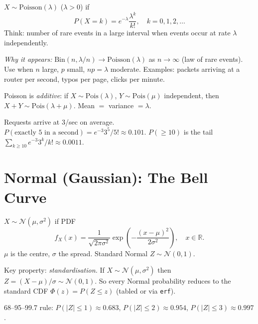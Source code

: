 \begin{definition}[Poisson] $X\sim\mathrm{Poisson}(\lambda)$ ($\lambda>0$) if
\[
P(X=k)=e^{-\lambda}\frac{\lambda^k}{k!},\quad k=0,1,2,\dots
\]
Think: number of rare events in a large interval when events occur at rate $\lambda$ independently.
\end{definition}

\emph{Why it appears:} $\mathrm{Bin}(n,\lambda/n)\to\mathrm{Poisson}(\lambda)$ as $n\to\infty$ (law of rare events). Use when $n$ large, $p$ small, $np=\lambda$ moderate. Examples: packets arriving at a router per second, typos per page, clicks per minute.

Poisson is \emph{additive}: if $X\sim\mathrm{Pois}(\lambda)$, $Y\sim\mathrm{Pois}(\mu)$ independent, then $X+Y\sim\mathrm{Pois}(\lambda+\mu)$. Mean $=$ variance $=\lambda$.

\begin{example} Requests arrive at $3$/sec on average. $P(\text{exactly }5\text{ in a second})=e^{-3}3^5/5!\approx0.101$. $P(\ge10)$ is the tail $\sum_{k\ge10}e^{-3}3^k/k!\approx0.0011$.
\end{example}

\section{Normal (Gaussian): The Bell Curve}
\label{sec:normal}

\begin{definition}[Normal] $X\sim\mathcal{N}(\mu,\sigma^2)$ if PDF
\[
f_X(x)=\frac{1}{\sqrt{2\pi\sigma^2}}\exp\!\left(-\frac{(x-\mu)^2}{2\sigma^2}\right),\quad x\in\mathbb{R}.
\]
$\mu$ is the centre, $\sigma$ the spread. Standard Normal $Z\sim\mathcal{N}(0,1)$.
\end{definition}

Key property: \emph{standardisation.} If $X\sim\mathcal{N}(\mu,\sigma^2)$ then $Z=(X-\mu)/\sigma\sim\mathcal{N}(0,1)$. So every Normal probability reduces to the standard CDF $\Phi(z)=P(Z\le z)$ (tabled or via \texttt{erf}).

68--95--99.7 rule: $P(|Z|\le1)\approx0.683$, $P(|Z|\le2)\approx0.954$, $P(|Z|\le3)\approx0.997$.

